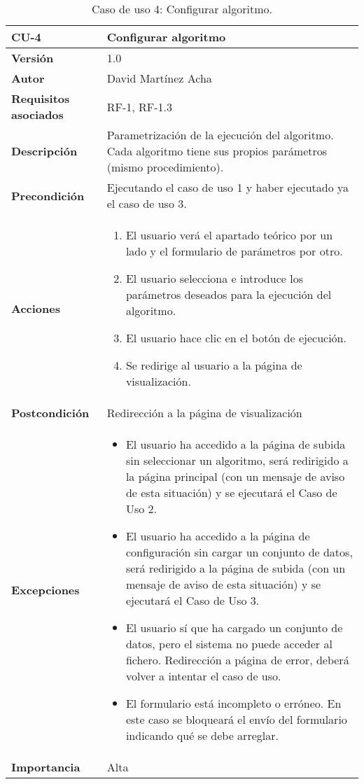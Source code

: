 \begin{table}[p]
	\centering
	\begin{tabularx}{\linewidth}{ p{} p{} }
		\toprule
		\textbf{CU-4}    & \textbf{Configurar algoritmo}\\
		\toprule
		\textbf{Versión}              & 1.0    \\
		\textbf{Autor}                & David Martínez Acha \\
		\textbf{Requisitos asociados} & RF-1, RF-1.3 \\
		\textbf{Descripción}          & Parametrización de la ejecución del algoritmo. Cada algoritmo tiene sus propios parámetros (mismo procedimiento). \\
		\textbf{Precondición}         & Ejecutando el caso de uso 1 y haber ejecutado ya el caso de uso 3. \\
		\textbf{Acciones}             &
		\begin{enumerate}
			\def\labelenumi{\arabic{enumi}.}
			\tightlist
			\item El usuario verá el apartado teórico por un lado y el formulario de parámetros por otro.
			\item El usuario selecciona e introduce los parámetros deseados para la ejecución del algoritmo.
			\item El usuario hace clic en el botón de ejecución.
			\item Se redirige al usuario a la página de visualización.
		\end{enumerate}\\
		\textbf{Postcondición}        & Redirección a la página de visualización \\
		\textbf{Excepciones}          & \begin{itemize}
			\item El usuario ha accedido a la página de subida sin seleccionar un algoritmo, será redirigido a la página principal (con un mensaje de aviso de esta situación) y se ejecutará el Caso de Uso 2.
			\item El usuario ha accedido a la página de configuración sin cargar un conjunto de datos, será redirigido a la página de subida (con un mensaje de aviso de esta situación) y se ejecutará el Caso de Uso 3.
			\item El usuario sí que ha cargado un conjunto de datos, pero el sistema no puede acceder al fichero. Redirección a página de error, deberá volver a intentar el caso de uso.
			\item El formulario está incompleto o erróneo. En este caso se bloqueará el envío del formulario indicando qué se debe arreglar.
		\end{itemize} \\
		\textbf{Importancia}          & Alta \\
		\bottomrule
	\end{tabularx}
	\caption{Caso de uso 4: Configurar algoritmo.}
\end{table}

